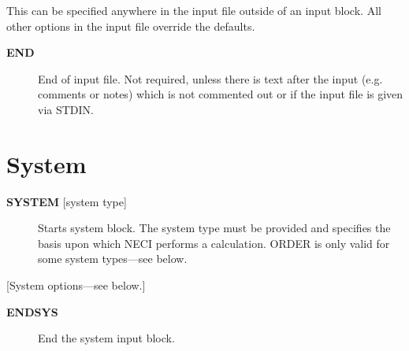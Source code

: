 \documentclass[openany,a4paper,10pt]{manual}
\begin{document}
This can be specified anywhere in the input file outside of an input block.  All other options in the input file override the defaults.
\begin{description}
\item[\textbf{END}]
End of input file.  Not required, unless there is text after the input (e.g. comments or notes) which is not commented out or if the input file is given via STDIN.

\end{description}

\resetcurrentobjects


\hypertarget{input-system}{}\section{System}
\begin{description}
\item[\textbf{SYSTEM} {[}system type{]}]
Starts system block.  The system type must be provided and specifies
the basis upon which NECI performs a calculation.  ORDER is only valid
for some system types---see below.

\end{description}

{[}System options---see below.{]}
\begin{description}
\item[\textbf{ENDSYS}]
End the system input block.

\end{description}
\end{document}
